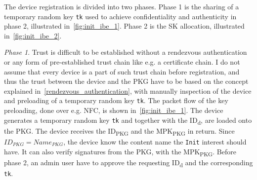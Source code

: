 The device registration is divided into two phases. 
Phase 1 is the sharing of a temporary random key \texttt{tk} used to achieve confidentiality and authenticity in phase 2, illustrated in~\autoref{fig:init_ibe_1}.
Phase 2 is the \gls{SK} allocation, illustrated in~\autoref{fig:init_ibe_2}.

\textit{Phase 1}.
Trust is difficult to be established without a rendezvous authentication or any form of pre-established trust chain like e.g. a certificate chain.
I do not assume that every device is a part of such trust chain before registration, and thus the trust between the device and the \gls{PKG} have to be based on the concept explained in~\autoref{rendezvous_authentication}, with manually inspection of the device and preloading of a temporary random key \texttt{tk}.
The packet flow of the key preloading, done over e.g. \gls{NFC}, is shown in~\autoref{fig:init_ibe_1}.
The device generates a temporary random key \texttt{tk} and together with the ID\textsubscript{d}, are loaded onto the \gls{PKG}.
The device receives the ID\textsubscript{PKG} and the MPK\textsubscript{PKG} in return.
Since $ID_{PKG} = Name_{PKG}$, the device know the content \gls{name} the \texttt{Init} \gls{interest} should have.
It can also verify signatures from the \gls{PKG}, with the MPK\textsubscript{PKG}. 
Before phase 2, an admin user have to approve the requesting ID\textsubscript{d} and the corresponding \texttt{tk}.

